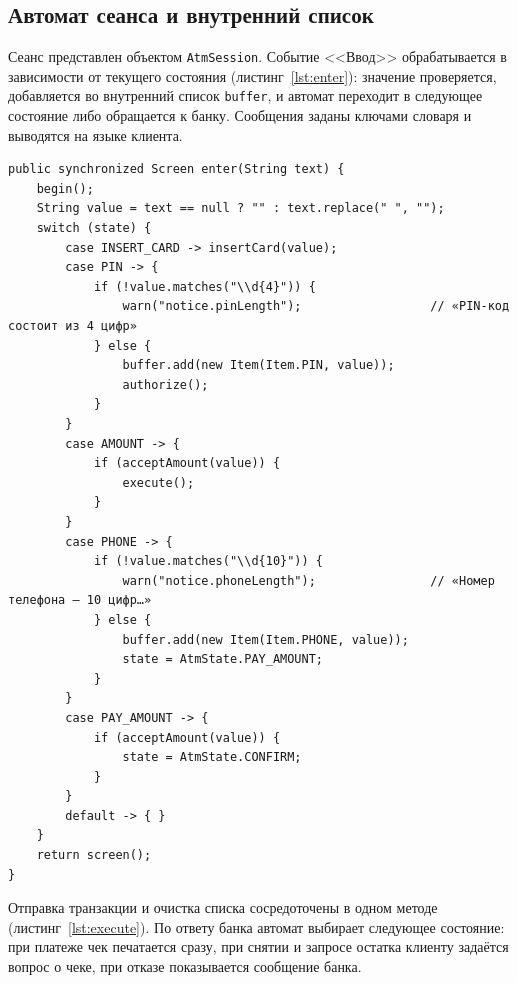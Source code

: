 \documentclass[14pt,a4paper]{extarticle}
\begin{document}
\subsection{Автомат сеанса и внутренний список}

Сеанс представлен объектом \texttt{AtmSession}. Событие <<Ввод>> обрабатывается в
зависимости от текущего состояния (листинг~\ref{lst:enter}): значение проверяется, добавляется
во внутренний список \texttt{buffer}, и автомат переходит в следующее состояние либо
обращается к банку. Сообщения заданы ключами словаря и выводятся на языке клиента.

\begin{lstlisting}[style=java, caption={Обработка ввода с клавиатуры (\texttt{AtmSession.enter})}, label={lst:enter}]
public synchronized Screen enter(String text) {
    begin();
    String value = text == null ? "" : text.replace(" ", "");
    switch (state) {
        case INSERT_CARD -> insertCard(value);
        case PIN -> {
            if (!value.matches("\\d{4}")) {
                warn("notice.pinLength");                  // «PIN-код состоит из 4 цифр»
            } else {
                buffer.add(new Item(Item.PIN, value));
                authorize();
            }
        }
        case AMOUNT -> {
            if (acceptAmount(value)) {
                execute();
            }
        }
        case PHONE -> {
            if (!value.matches("\\d{10}")) {
                warn("notice.phoneLength");                // «Номер телефона — 10 цифр…»
            } else {
                buffer.add(new Item(Item.PHONE, value));
                state = AtmState.PAY_AMOUNT;
            }
        }
        case PAY_AMOUNT -> {
            if (acceptAmount(value)) {
                state = AtmState.CONFIRM;
            }
        }
        default -> { }
    }
    return screen();
}
\end{lstlisting}

Отправка транзакции и очистка списка сосредоточены в одном методе
(листинг~\ref{lst:execute}). По ответу банка автомат выбирает следующее состояние: при
платеже чек печатается сразу, при снятии и запросе остатка клиенту задаётся вопрос о чеке,
при отказе показывается сообщение банка.
\end{document}

